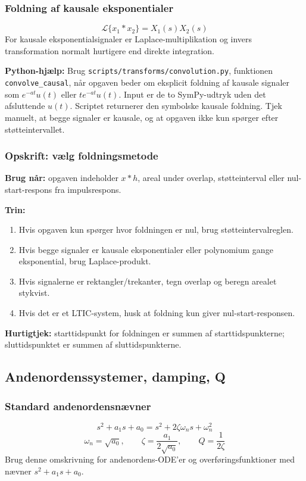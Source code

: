 \subsubsection{Foldning af kausale eksponentialer}
\[
\mathcal{L}\{x_1*x_2\}=X_1(s)X_2(s)
\]
For kausale eksponentialsignaler er Laplace-multiplikation og invers transformation normalt hurtigere end direkte integration.

\textbf{Python-hjælp:} Brug \texttt{scripts/transforms/convolution.py}, funktionen \texttt{convolve\_causal}, når opgaven beder om eksplicit foldning af kausale signaler som \(e^{-at}u(t)\) eller \(t e^{-at}u(t)\). Input er de to SymPy-udtryk uden det afsluttende \(u(t)\). Scriptet returnerer den symbolske kausale foldning. Tjek manuelt, at begge signaler er kausale, og at opgaven ikke kun spørger efter støtteintervallet.

\subsubsection{Opskrift: vælg foldningsmetode}
\textbf{Brug når:} opgaven indeholder \(x*h\), areal under overlap, støtteinterval eller nul-start-respons fra impulsrespons.

\textbf{Trin:}
\begin{enumerate}
    \item Hvis opgaven kun spørger hvor foldningen er nul, brug støtteintervalreglen.
    \item Hvis begge signaler er kausale eksponentialer eller polynomium gange eksponential, brug Laplace-produkt.
    \item Hvis signalerne er rektangler/trekanter, tegn overlap og beregn arealet stykvist.
    \item Hvis det er et LTIC-system, husk at foldning kun giver nul-start-responsen.
\end{enumerate}

\textbf{Hurtigtjek:} starttidspunkt for foldningen er summen af starttidspunkterne; sluttidspunktet er summen af sluttidspunkterne.

\subsection{Andenordenssystemer, damping, Q}

\subsubsection{Standard andenordensnævner}
\[
s^2+a_1s+a_0=s^2+2\zeta\omega_n s+\omega_n^2
\]
\[
\omega_n=\sqrt{a_0},\qquad
\zeta=\frac{a_1}{2\sqrt{a_0}},\qquad
Q=\frac{1}{2\zeta}
\]
Brug denne omskrivning for andenordens-ODE'er og overføringsfunktioner med nævner \(s^2+a_1s+a_0\).

